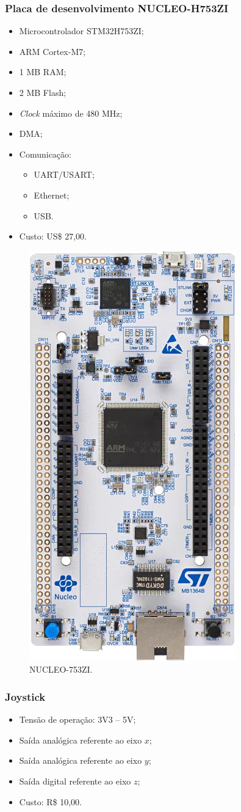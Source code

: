 \subsubsection*{Placa de desenvolvimento NUCLEO-H753ZI}
	
	\begin{itemize}
		\item Microcontrolador STM32H753ZI;
		\item ARM Cortex-M7;
		\item 1 MB RAM;
		\item 2 MB Flash;
		\item \textit{Clock} máximo de 480 MHz;
		\item DMA;
		\item Comunicação:
		\begin{itemize}
			\item UART/USART;
			\item Ethernet;
			\item USB.
		\end{itemize}
		\item Custo: US\$ 27,00.
	\end{itemize}

\begin{figure}[H]
	\centering
	\includegraphics[width=0.25\linewidth]{img/nucleo}
	\caption{NUCLEO-753ZI.}
	\label{fig:nucleo}
\end{figure}

\subsubsection*{Joystick}
	
	\begin{itemize}
		\item Tensão de operação: 3V3 -- 5V;
		\item Saída analógica referente ao eixo $x$;
		\item Saída analógica referente ao eixo $y$;
		\item Saída digital referente ao eixo $z$;
		\item Custo: R\$ 10,00.
	\end{itemize}

